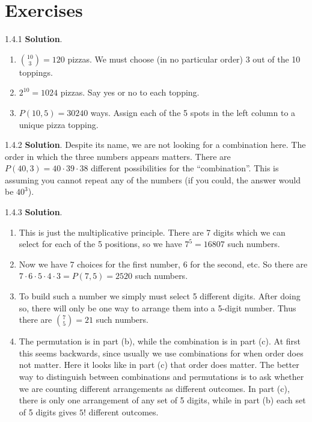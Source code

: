 \documentclass[11pt,]{book}
\theoremstyle{ptxplainnotitle}
\theoremstyle{ptxplaintitle}
\theoremstyle{ptxdefinitionnotitle}
\theoremstyle{ptxdefinitiontitle}
\theoremstyle{ptxdefinitionnotitle}
\theoremstyle{ptxdefinitiontitle}
\theoremstyle{ptxdefinitionnotitle}
\theoremstyle{ptxdefinitiontitle}
\theoremstyle{ptxdefinitiontitlenonumber}
\theoremstyle{ptxdefinitiontitlenonumber}
\numberwithin{equation}{chapter}
\begin{document}
\section*{Exercises}
\begin{divisionexercise}{1.4.1}
\textbf{Solution}.\quad%
\hypertarget{p-1568}{}%
\leavevmode%
\begin{enumerate}[label=\alph*.]
\item\hypertarget{li-678}{}\hypertarget{p-1569}{}%
\({10 \choose 3} = 120\) pizzas.  We must choose (in no particular order) 3 out of the 10 toppings.%
\item\hypertarget{li-679}{}\hypertarget{p-1570}{}%
\(2^{10} = 1024\) pizzas.  Say yes or no to each topping.%
\item\hypertarget{li-680}{}\hypertarget{p-1571}{}%
\(P(10,5) = 30240\) ways.  Assign each of the 5 spots in the left column to a unique pizza topping.%
\end{enumerate}
%
\end{divisionexercise}%
\begin{divisionexercise}{1.4.2}
\textbf{Solution}.\quad%
\hypertarget{p-1577}{}%
Despite its name, we are not looking for a combination here. The order in which the three numbers appears matters. There are \(P(40,3) = 40\cdot 39 \cdot 38\) different possibilities for the ``combination''. This is assuming you cannot repeat any of the numbers (if you could, the answer would be \(40^3\)).%
\end{divisionexercise}%
\begin{divisionexercise}{1.4.3}
\textbf{Solution}.\quad%
\hypertarget{p-1601}{}%
\leavevmode%
\begin{enumerate}[label=\alph*.]
\item\hypertarget{li-693}{}\hypertarget{p-1602}{}%
This is just the multiplicative principle. There are 7 digits which we can select for each of the 5 positions, so we have \(7^5 = 16807\) such numbers.%
\item\hypertarget{li-694}{}\hypertarget{p-1603}{}%
Now we have 7 choices for the first number, 6 for the second, etc. So there are \(7 \cdot 6 \cdot 5 \cdot 4 \cdot 3 = P(7,5) = 2520\) such numbers.%
\item\hypertarget{li-695}{}\hypertarget{p-1604}{}%
To build such a number we simply must select 5 different digits. After doing so, there will only be one way to arrange them into a 5-digit number. Thus there are \({7 \choose 5} = 21\) such numbers.%
\item\hypertarget{li-696}{}\hypertarget{p-1605}{}%
The permutation is in part (b), while the combination is in part (c). At first this seems backwards, since usually we use combinations for when order does not matter. Here it looks like in part (c) that order does matter. The better way to distinguish between combinations and permutations is to ask whether we are counting different arrangements as different outcomes. In part (c), there is only one arrangement of any set of 5 digits, while in part (b) each set of 5 digits gives \(5!\) different outcomes.%
\end{enumerate}
%
\end{divisionexercise}%
\end{document}
